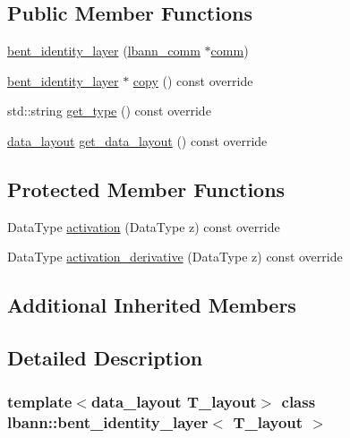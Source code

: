 \subsection*{Public Member Functions}
\begin{DoxyCompactItemize}
\item 
\hyperlink{classlbann_1_1bent__identity__layer_a74743e746947316d6fa043c39c5688b8}{bent\+\_\+identity\+\_\+layer} (\hyperlink{classlbann_1_1lbann__comm}{lbann\+\_\+comm} $\ast$\hyperlink{file__io_8cpp_ab048c6f9fcbcfaa57ce68b00263dbebe}{comm})
\item 
\hyperlink{classlbann_1_1bent__identity__layer}{bent\+\_\+identity\+\_\+layer} $\ast$ \hyperlink{classlbann_1_1bent__identity__layer_aab5919fa670a2d93045c723f7dfce5ab}{copy} () const override
\item 
std\+::string \hyperlink{classlbann_1_1bent__identity__layer_aaecb80232b00be688db24c235c6de074}{get\+\_\+type} () const override
\item 
\hyperlink{base_8hpp_a786677cbfb3f5677b4d84f3056eb08db}{data\+\_\+layout} \hyperlink{classlbann_1_1bent__identity__layer_a6529bc010caf29864753fef567f5e4de}{get\+\_\+data\+\_\+layout} () const override
\end{DoxyCompactItemize}
\subsection*{Protected Member Functions}
\begin{DoxyCompactItemize}
\item 
Data\+Type \hyperlink{classlbann_1_1bent__identity__layer_a496012ccbb6601afb8de972e943d7942}{activation} (Data\+Type z) const override
\item 
Data\+Type \hyperlink{classlbann_1_1bent__identity__layer_ae331e8e0f830641cba6b3561f5474eb3}{activation\+\_\+derivative} (Data\+Type z) const override
\end{DoxyCompactItemize}
\subsection*{Additional Inherited Members}


\subsection{Detailed Description}
\subsubsection*{template$<$data\+\_\+layout T\+\_\+layout$>$\newline
class lbann\+::bent\+\_\+identity\+\_\+layer$<$ T\+\_\+layout $>$}

